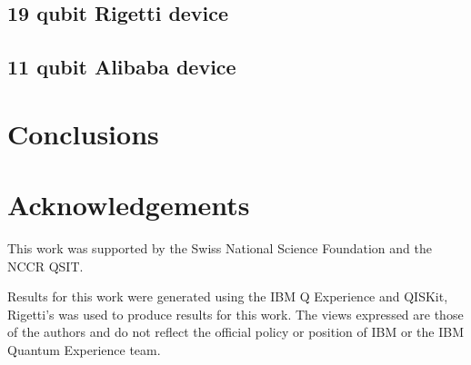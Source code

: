 \documentclass[aps,prl,twocolumn,showpacs,preprintnumbers]{revtex4-1}
\begin{document}
\subsection{19 qubit Rigetti device}

\subsection{11 qubit Alibaba device}



\section{Conclusions}






\section{Acknowledgements}

This work was supported by the Swiss National Science Foundation and the NCCR QSIT.

Results for this work were generated using the IBM Q Experience and QISKit, Rigetti’s was used to produce results for this work. The views expressed are those of the authors and do not reflect the official policy or position of IBM or the IBM Quantum Experience team.



\end{document}

